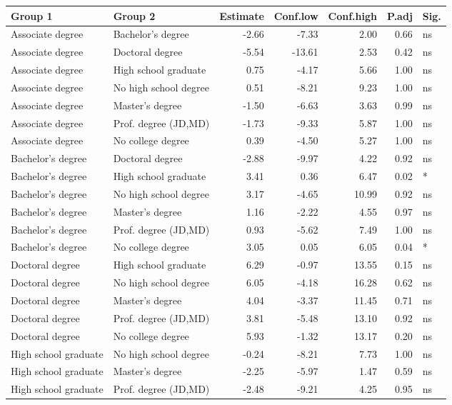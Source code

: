 \documentclass{article}
\begin{document}
\begin{table}[ht]
\begin{tabular}{llrrrrl}
  \hline
Group 1 & Group 2 & Estimate & Conf.low & Conf.high & P.adj & Sig. \\ 
  \hline
 Associate degree & Bachelor's degree  & -2.66 & -7.33 & 2.00 & 0.66 & ns \\ 
 Associate degree & Doctoral degree  & -5.54 & -13.61 & 2.53 & 0.42 & ns \\ 
 Associate degree & High school graduate  & 0.75 & -4.17 & 5.66 & 1.00 & ns \\ 
 Associate degree & No high school degree  & 0.51 & -8.21 & 9.23 & 1.00 & ns \\ 
 Associate degree & Master's degree  & -1.50 & -6.63 & 3.63 & 0.99 & ns \\ 
 Associate degree & Prof. degree (JD,MD)  & -1.73 & -9.33 & 5.87 & 1.00 & ns \\ 
 Associate degree & No college degree  & 0.39 & -4.50 & 5.27 & 1.00 & ns \\ 
Bachelor's degree & Doctoral degree  & -2.88 & -9.97 & 4.22 & 0.92 & ns \\ 
Bachelor's degree & High school graduate  & 3.41 & 0.36 & 6.47 & 0.02 & * \\ 
Bachelor's degree & No high school degree  & 3.17 & -4.65 & 10.99 & 0.92 & ns \\ 
Bachelor's degree & Master's degree  & 1.16 & -2.22 & 4.55 & 0.97 & ns \\ 
Bachelor's degree & Prof. degree (JD,MD)  & 0.93 & -5.62 & 7.49 & 1.00 & ns \\ 
Bachelor's degree & No college degree  & 3.05 & 0.05 & 6.05 & 0.04 & * \\ 
Doctoral degree & High school graduate  & 6.29 & -0.97 & 13.55 & 0.15 & ns \\ 
Doctoral degree & No high school degree  & 6.05 & -4.18 & 16.28 & 0.62 & ns \\ 
Doctoral degree & Master's degree  & 4.04 & -3.37 & 11.45 & 0.71 & ns \\ 
Doctoral degree & Prof. degree (JD,MD)  & 3.81 & -5.48 & 13.10 & 0.92 & ns \\ 
 Doctoral degree & No college degree  & 5.93 & -1.32 & 13.17 & 0.20 & ns \\ 
 High school graduate & No high school degree  & -0.24 & -8.21 & 7.73 & 1.00 & ns \\ 
 High school graduate & Master's degree  & -2.25 & -5.97 & 1.47 & 0.59 & ns \\ 
 High school graduate & Prof. degree (JD,MD)  & -2.48 & -9.21 & 4.25 & 0.95 & ns \\ 

\end{tabular}
\end{table}
\end{document}
